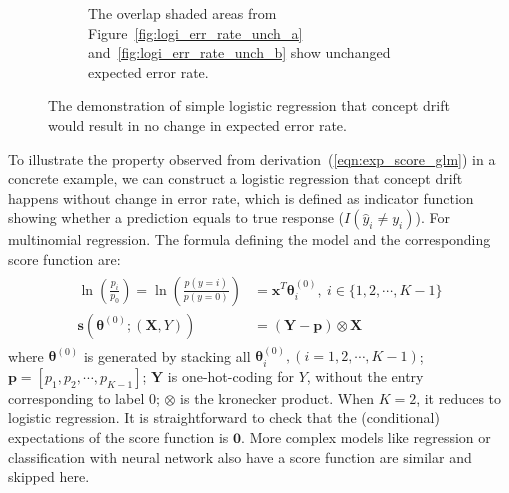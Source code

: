 \documentclass[twoside,11pt]{article}
\begin{document}
\begin{figure}[!htbp]
\begin{subfigure}[t]{0.5\linewidth}
         \caption{The overlap shaded areas from Figure~\ref{fig:logi_err_rate_unch_a} and~\ref{fig:logi_err_rate_unch_b} show unchanged expected error rate.}
         \label{fig:logi_err_rate_unch_c}
  \end{subfigure}
  \caption{The demonstration of simple logistic regression that concept drift would result in no change in expected error rate.}
  \label{fig:logi_err_rate_unch}
\end{figure}

To illustrate the property observed from derivation~(\ref{eqn:exp_score_glm}) in a concrete example, we can construct a logistic regression that concept drift happens without change in error rate, which is defined as indicator function showing whether a prediction equals to true response ($I(\hat {y}_i \neq y_i)$). For multinomial regression. The formula defining the model and the corresponding score function are:
\begin{align}
\begin{aligned}
\ln (\frac{p_i}{p_0}) = \ln (\frac{p(y=i)}{p(y=0)})&=\bm {x}^{T} \bm { \theta}_i^{(0)}, ~ i \in \{1,2,\cdots,K-1\} \\
\bm {s}(\bm { \theta} ^{ (0)}; (\bm {X}, Y)) &= (\bm {Y}-\bm {p})\otimes \bm {X}
\end{aligned}
\label{eqn:multi_score}
\end{align}
where $\bm { \theta} ^{ (0)}$ is generated by stacking all $ \bm { \theta}_i ^{(0)}, (i=1,2,\cdots,K-1)$; $\bm {p}= [p_1, p_2, \cdots, p _{K-1}]$; $\bm {Y}$ is one-hot-coding for $Y$, without the entry corresponding to label $0$; $\otimes$ is the kronecker product. When $K=2$, it reduces to logistic regression. It is straightforward to check that the (conditional) expectations of the score function is $\bm {0}$. More complex models like regression or classification with neural network also have a score function are similar and skipped here. 
\end{document}
